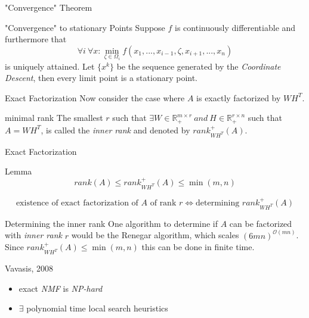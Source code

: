 \documentclass[aspectratio=169]{beamer}
\begin{document}
\begin{frame}{"Convergence" Theorem}
    \begin{block}{"Convergence" to stationary Points}
        Suppose $f$ is continuously differentiable and furthermore that \\
        \[\forall i \ \forall x: \min_{\zeta \in \Omega_i} f(x_1, ..., x_{i-1}, \zeta, x_{i+1}, ..., x_n)\] 
        is uniquely attained.
        Let \( \{x^k\} \) be the sequence generated by the \emph{Coordinate Descent}, then every limit point is a stationary point.
    \end{block}
\end{frame}

\begin{frame}{Exact Factorization}
    Now consider the case where $A$ is exactly factorized by $WH^T$.
    \begin{block}{minimal rank}
        The smallest $r$ such that \(\exists W \in \mathbb{R}^{m \times r}_+ \ and \ H \in \mathbb{R}^{r \times n}_+\) such that $A=WH^T$, is called the \emph{inner rank} and denoted by $rank_{WH^T}^+ (A)$. 
    \end{block}

\end{frame}

\begin{frame}{Exact Factorization}
    \begin{block}{Lemma}
        \[ rank(A) \leq rank_{WH^T}^+ (A) \leq \min(m,n)\]
    \end{block}
    
    \[\text{existence of exact factorization of $A$ of rank $r$} \iff \text{determining } rank_{WH^T}^+ (A) \]
\end{frame}

\begin{frame}{Determining the inner rank}
    One algorithm to determine if $A$ can be factorized with \emph{inner rank} $r$ would be the Renegar algorithm, which scales $(6mn)^{\mathcal{O}(mn)}$. \\
    Since $rank_{WH^T}^+ (A) \leq \min(m,n)$ this can be done in finite time.
    \begin{block}{Vavasis, 2008}
        \begin{itemize}
            \item exact \emph{NMF} is \emph{NP-hard}
            \item $\exists$ polynomial time local search heuristics
        \end{itemize}
    \end{block}
\end{frame}
\end{document}
